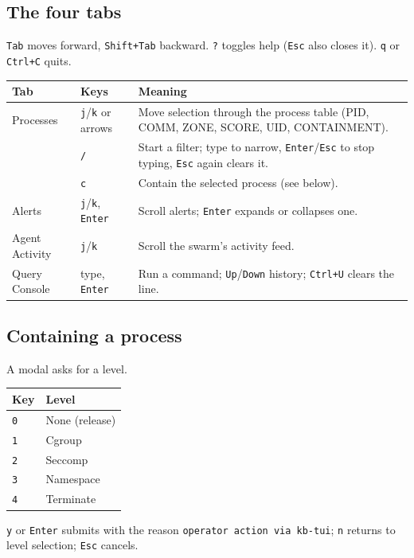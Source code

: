 \subsection{The four tabs}
\texttt{Tab} moves forward, \texttt{Shift+Tab} backward. \texttt{?} toggles help (\texttt{Esc} also closes it).
\texttt{q} or \texttt{Ctrl+C} quits.
\begin{center}\small
\begin{tabularx}{\textwidth}{@{}L{3cm}L{4.2cm}Y@{}}
\toprule
\textbf{Tab} & \textbf{Keys} & \textbf{Meaning}\\
\midrule
Processes & \texttt{j}/\texttt{k} or arrows & Move selection through the process table (PID, COMM, ZONE, SCORE, UID, CONTAINMENT).\\
 & \texttt{/} & Start a filter; type to narrow, \texttt{Enter}/\texttt{Esc} to stop typing, \texttt{Esc} again clears it.\\
 & \texttt{c} & Contain the selected process (see below).\\
Alerts & \texttt{j}/\texttt{k}, \texttt{Enter} & Scroll alerts; \texttt{Enter} expands or collapses one.\\
Agent Activity & \texttt{j}/\texttt{k} & Scroll the swarm's activity feed.\\
Query Console & type, \texttt{Enter} & Run a command; \texttt{Up}/\texttt{Down} history; \texttt{Ctrl+U} clears the line.\\
\bottomrule
\end{tabularx}
\end{center}

\subsection{Containing a process}
\resetsteps
{} A modal asks for a level.
\begin{center}\small
\begin{tabular}{@{}ll@{}}
\toprule \textbf{Key} & \textbf{Level}\\ \midrule
\texttt{0} & None (release)\\ \texttt{1} & Cgroup\\ \texttt{2} & Seccomp\\ \texttt{3} & Namespace\\ \texttt{4} & Terminate\\ \bottomrule
\end{tabular}
\end{center}
 \texttt{y} or \texttt{Enter} submits with the reason \texttt{operator action via kb-tui};
\texttt{n} returns to level selection; \texttt{Esc} cancels.

